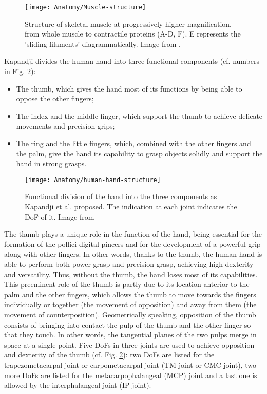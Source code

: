 \documentclass[main]{subfiles}
\begin{document}
\begin{figure}[H]
\centering
\texttt{[image: Anatomy/Muscle-structure]}
\caption[Structure of skeletal muscle]{Structure of skeletal muscle at progressively higher magnification, from whole muscle to contractile proteins (A-D, F). E represents the 'sliding filaments' diagrammatically. Image from \cite{thefreedictionary}.}
\label{hand-anthropometric}
\end{figure}

Kapandji divides the human hand into three functional components \cite{Kapandji1982} (cf. numbers in Fig. \ref{human-hand-structure}):
\begin{itemize}
\itemsep0.1em
\item The thumb, which gives the hand most of its functions by being able to oppose the other fingers;
\item The index and the middle finger, which support the thumb to achieve delicate movements and precision grips;
\item The ring and the little fingers, which, combined with the other fingers and the palm, give the hand its capability to grasp objects solidly and support the hand in strong grasps.
\end{itemize}

\begin{figure}[H]
\centering
\texttt{[image: Anatomy/human-hand-structure]}
\caption[Kapandji et al.'s functional hand division]{Functional division of the hand into the three components as Kapandji et al. proposed. The indication at each joint indicates the DoF of it. Image from \cite{Kapandji1982}}
\label{human-hand-structure}
\end{figure}

The thumb plays a unique role in the function of the hand, being essential for the formation of the pollici-digital pincers and for the development of a powerful grip along with other fingers. In other words, thanks to the thumb, the human hand is able to perform both power grasp and precision grasp, achieving high dexterity and versatility. Thus, without the thumb, the hand loses most of its capabilities. This preeminent role of the thumb is partly due to its location anterior to the palm and the other fingers, which allows the thumb to move towards the fingers individually or together (the movement of opposition) and away from them (the movement of counterposition). Geometrically speaking, opposition of the thumb consists of bringing into contact the pulp of the thumb and the other finger so that they touch. In other words, the tangential planes of the two pulps merge in space at a single point. Five DoFs in three joints are used to achieve opposition and dexterity of the thumb (cf. Fig. \ref{human-hand-structure}): two DoFs are listed for the trapezometacarpal joint or carpometacarpal joint (TM joint or CMC joint), two more DoFs are listed for the metacarpophalangeal (MCP) joint and a last one is allowed by the interphalangeal joint (IP joint).
\end{document}
